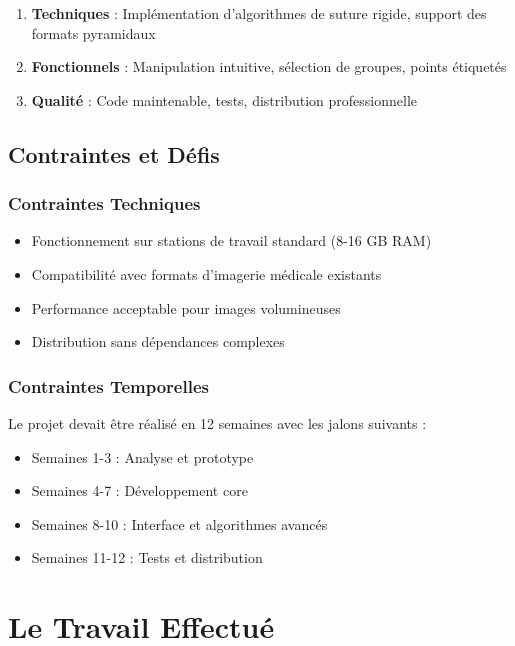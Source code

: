 \documentclass[12pt,a4paper]{article}
\begin{document}
\begin{enumerate}
\item \textbf{Techniques} : Implémentation d'algorithmes de suture rigide, support des formats pyramidaux
\item \textbf{Fonctionnels} : Manipulation intuitive, sélection de groupes, points étiquetés
\item \textbf{Qualité} : Code maintenable, tests, distribution professionnelle
\end{enumerate}

\subsection{Contraintes et Défis}

\subsubsection{Contraintes Techniques}

\begin{itemize}
\item Fonctionnement sur stations de travail standard (8-16 GB RAM)
\item Compatibilité avec formats d'imagerie médicale existants
\item Performance acceptable pour images volumineuses
\item Distribution sans dépendances complexes
\end{itemize}

\subsubsection{Contraintes Temporelles}

Le projet devait être réalisé en 12 semaines avec les jalons suivants :
\begin{itemize}
\item Semaines 1-3 : Analyse et prototype
\item Semaines 4-7 : Développement core
\item Semaines 8-10 : Interface et algorithmes avancés
\item Semaines 11-12 : Tests et distribution
\end{itemize}

\newpage

\section{Le Travail Effectué}
\end{document}
